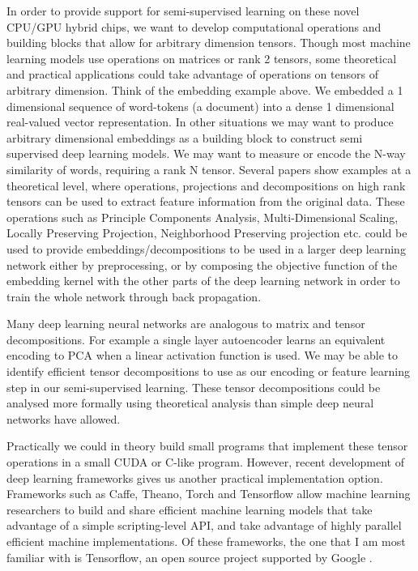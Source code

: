 In order to provide support for semi-supervised learning on these novel CPU/GPU hybrid chips, we want to develop computational operations and building blocks that allow for arbitrary dimension tensors. Though most machine learning models use operations on matrices or rank 2 tensors, some theoretical and practical applications could take advantage of operations on tensors of arbitrary dimension. Think of the embedding example above. We embedded a 1 dimensional sequence of word-tokens (a document) into a dense 1 dimensional real-valued vector representation. In other situations we may want to produce arbitrary dimensional embeddings as a building block to construct semi supervised deep learning models. We may want to measure or encode the N-way similarity of words, requiring a rank N tensor. Several papers show examples at a theoretical level, where operations, projections and decompositions on high rank tensors can be used to extract feature information from the original data\cite{cichocki2016low, cichocki2014tensor}. These operations such as Principle Components Analysis, Multi-Dimensional Scaling, Locally Preserving Projection, Neighborhood Preserving projection etc. could be used to provide embeddings/decompositions to be used in a larger deep learning network either by preprocessing, or by composing the objective function of the embedding kernel with the other parts of the deep learning network in order to train the whole network through back propagation.

Many deep learning neural networks are analogous to matrix and tensor decompositions. For example a single layer autoencoder learns an equivalent encoding to PCA when a linear activation function is used\cite{hinton2006reducing}. We may be able to identify efficient tensor decompositions to use as our encoding or feature learning step in our semi-supervised learning. These tensor decompositions could be analysed more formally using theoretical analysis than simple deep neural networks have allowed.

Practically we could in theory build small programs that implement these tensor operations in a small CUDA or C-like program. However, recent development of deep learning frameworks gives us another practical implementation option. Frameworks such as Caffe, Theano, Torch and Tensorflow allow machine learning researchers to build and share efficient machine learning models that take advantage of a simple scripting-level API, and take advantage of highly parallel efficient machine implementations. Of these frameworks, the one that I am most familiar with is Tensorflow, an open source project supported by Google \cite{abadi2016tensorflow}. 

